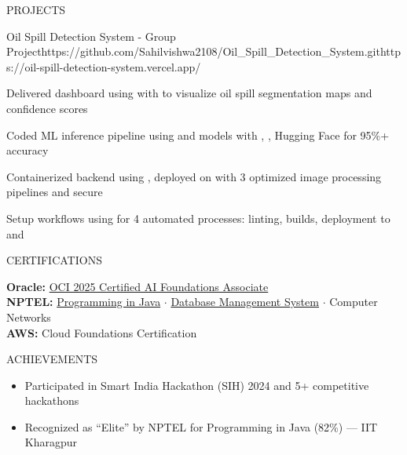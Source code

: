 \documentclass{resume}
\begin{document}
\begin{rSection}{PROJECTS}
\begin{rProject}{Oil Spill Detection System - Group Project}{https://github.com/Sahilvishwa2108/Oil_Spill_Detection_System.git}{https://oil-spill-detection-system.vercel.app/}
\item Delivered dashboard using  with  to visualize oil spill segmentation maps and confidence scores
\item Coded ML inference pipeline using  and  models with , , Hugging Face for 95\%+ accuracy
\item Containerized backend using , deployed on  with 3 optimized image processing pipelines and secure 
\item Setup  workflows using  for 4 automated processes: linting, builds, deployment to  and 
\end{rProject}

\end{rSection}

\begin{rSection}{CERTIFICATIONS}

\textbf{Oracle:} \href{https://catalog-education.oracle.com/ords/certview/sharebadge?id=08DD03676BF6CB0DE9DA3D11E1F0F10FFE9F710A5961C592D02D1C3543E10050}{OCI 2025 Certified AI Foundations Associate} \\[1pt]
\textbf{NPTEL:} \href{https://archive.nptel.ac.in/content/noc/NOC25/SEM1/Ecertificates/106/noc25-cs57/Course/NPTEL25CS57S124280252304432710.pdf}{Programming in Java} $\cdot$ \href{https://archive.nptel.ac.in/content/noc/NOC25/SEM1/Ecertificates/106/noc25-cs18/Course/NPTEL25CS18S53880028401363129.pdf}{Database Management System} $\cdot$ {Computer Networks} \\[1pt]
\textbf{AWS:} {Cloud Foundations Certification}

\end{rSection}

\begin{rSection}{ACHIEVEMENTS}

\begin{itemize}[leftmargin=12pt, itemsep=0pt, label={\small$\bullet$}]
\item Participated in Smart India Hackathon (SIH) 2024 and 5+ competitive hackathons
\item Recognized as ``Elite'' by NPTEL for Programming in Java (82\%) — IIT Kharagpur
\end{itemize}

\end{rSection}
\end{document}
